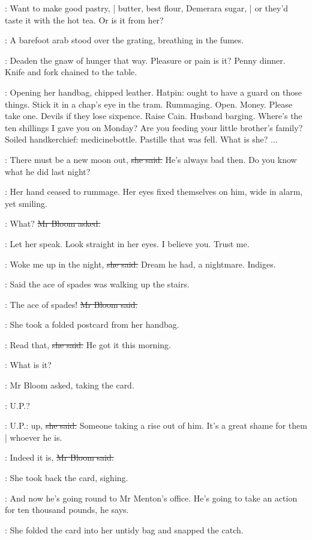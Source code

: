 \BloomInt:
Want to make good pastry, |
butter, best flour, Demerara sugar, |
or they'd taste it with the hot tea.
Or is it from her?

:
A barefoot arab stood over the grating,
breathing in the fumes.

\BloomInt:
Deaden the gnaw of hunger that way.
Pleasure or pain is it?
Penny dinner.
Knife and fork
chained to the table.

\BloomInt:
Opening her handbag, chipped leather.
Hatpin:
ought to have a guard on those things.
Stick it in a chap's eye in the tram.
Rummaging.
Open.
Money.
Please take one.
Devils if they lose sixpence.
Raise Cain.
Husband barging.
Where's the ten shillings I gave you on Monday?
Are you feeding your little brother's family?
Soiled handkerchief:
medicinebottle.
Pastille that was fell.
What is she?
...

\josie:
There must be a new moon out,
\sout{she said.}
He's always bad then.
Do you know what he did last night?

:
Her hand ceased to rummage.
Her eyes fixed themselves on him,
wide in alarm,
yet smiling.

\Bloom:
What?
\sout{Mr Bloom asked.}

\BloomInt:
Let her speak.
Look straight in her eyes.
I believe you.
Trust me.

\josie:
Woke me up in the night,
\sout{she said.}
Dream he had,
a nightmare.
Indiges.

\josie:
Said the ace of spades was walking up the stairs.

\Bloom:
The ace of spades!
\sout{Mr Bloom said.}

:
She took a folded postcard from her handbag.

\josie:
Read that,
\sout{she said.}
He got it this morning.

\Bloom:
What is it?

:
Mr Bloom asked,
taking the card.

\Bloom:
U.P.?

\josie:
U.P.: up,
\sout{she said.}
Someone taking a rise out of him.
It's a great shame for them |
whoever he is.

\Bloom:
Indeed it is,
\sout{Mr Bloom said.}

:
She took back the card,
sighing.

\josie:
And now he's going round to Mr Menton's office.
He's going to take an action for ten thousand pounds,
he says.

:
She folded the card into her untidy bag and snapped the catch.

